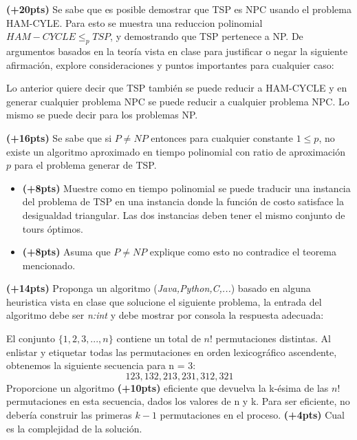 \documentclass[12pt, a4paper]{exam}
\begin{document}
\begin{questions}
	\pointsdroppedatright
	\question \textbf{(+20pts)} Se sabe que es posible demostrar que TSP es NPC usando el problema HAM-CYLE.
	Para esto se muestra una reduccion polinomial $HAM-CYCLE \leq_p TSP$, y demostrando que TSP
	pertenece a NP. De argumentos basados en la teoría vista en clase para justificar o 
	negar la siguiente afirmación, explore consideraciones y puntos importantes para cualquier caso:
	
		Lo anterior quiere decir que TSP también se puede reducir a HAM-CYCLE y en generar
		cualquier problema NPC se puede reducir  a cualquier problema NPC. Lo mismo se puede 
		decir para los problemas NP.

    \question \textbf{(+16pts)} Se sabe que si $P \not = NP$ entonces para cualquier constante 
	$1 \leq p$, no existe un algoritmo aproximado en tiempo polinomial  con ratio de aproximación 
	$p$ para el problema generar de TSP. 
	\begin{itemize}
		\item \textbf{(+8pts)} Muestre como en tiempo polinomial se puede traducir una 
		instancia del problema de TSP en una instancia donde la función de costo satisface la desigualdad
		triangular. Las dos instancias deben tener el mismo conjunto de tours óptimos. 
		\item \textbf{(+8pts)} Asuma que $P \not = NP$ explique como esto no contradice el teorema mencionado. 
	\end{itemize}
    \question \textbf{(+14pts)} Proponga un algoritmo (\textit{Java,Python,C,...}) basado en alguna heuristica
	vista en clase que solucione el siguiente problema, la entrada del algoritmo debe ser \textit{n:int} 
	y debe mostrar por consola la respuesta adecuada:

	El conjunto $\{1, 2, 3, ..., n\}$ contiene un total de $n!$ permutaciones distintas. 
	Al enlistar y etiquetar todas las permutaciones en orden lexicográfico ascendente, 
	obtenemos la siguiente secuencia para n = 3:
		\[ 123, 132, 213, 231, 312, 321 \]
	Proporcione un algoritmo \textbf{(+10pts)} eficiente que devuelva la k-ésima de las $n!$ permutaciones 
	en esta secuencia, dados los valores de n y k. Para ser eficiente, no debería 
	construir las primeras $k-1$ permutaciones en el proceso. \textbf{(+4pts)} Cual es la complejidad de la solución.
	

\end{questions}
\end{document}
